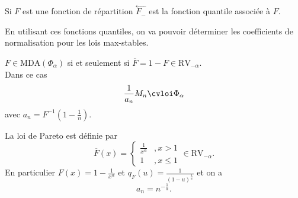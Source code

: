 \documentclass[10p,a4paper,reqno,titlepage]{report}
\begin{document}
\begin{rem}
	Si $F$ est une fonction de répartition $ \overset{\leftarrow}{F_- }$ est la fonction quantile associée à $F$.
\end{rem}
En utilisant ces fonctions quantiles, on va pouvoir déterminer les coefficients de normalisation pour les lois max-stables.
\begin{prop}
	$F \in \mathrm{MDA}(\Phi_\alpha)$ si et seulement si $ \overline{F}=1-F \in\mathrm{RV}_{-\alpha}$.\\
	Dans ce cas 
	$$ \frac{1}{a_n} M_n \cvloi \Phi_\alpha$$
	avec $a_n= F^{-1} (1-\tfrac1n ).$
\end{prop}
\begin{rem}
La loi de Pareto est définie par 
$$ \overline{F}(x)= \left\{\begin{array}{ll} \frac{1}{x^\alpha}&, x > 1\\ 1&, x \leq 1 
	\end{array}\right. \in \mathrm{RV}_{-\alpha}.$$
En particulier $F(x)= 1 -\frac{1}{x^\alpha}$ et $q_F (u)= \frac{1}{(1-u)^\tfrac{1}{\alpha}}$ et on a 
$$ a_n = n^{-\tfrac{1}{\alpha}}.$$
\end{rem}
\end{document}
